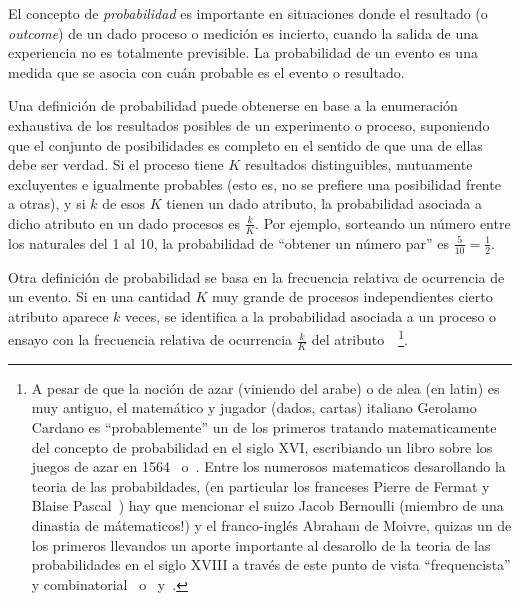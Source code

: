 \label{s:MP:Probabilidad}

El  concepto  de  {\it  probabilidad}  es importante  en  situaciones  donde  el
resultado (o {\it outcome}) de un  dado proceso o medici\'on es incierto, cuando
la salida de una experiencia no  es totalmente previsible. La probabilidad de un
evento es una medida que se asocia con cu\'an probable es el evento o resultado.

Una  definici\'on de  probabilidad puede  obtenerse en  base a  la enumeraci\'on
exhaustiva de los resultados posibles de un experimento o proceso,
suponiendo que el conjunto de posibilidades es completo en el sentido de que una
de  ellas debe ser  verdad. Si  el proceso  tiene $K$  resultados distinguibles,
mutuamente  excluyentes e  igualmente probables  (esto  es, no  se prefiere  una
posibilidad frente a  otras), y si $k$  de esos $K$ tienen un  dado atributo, la
probabilidad asociada a dicho atributo en un dado procesos es $\frac{k}{K}$. Por
ejemplo, sorteando un n\'umero entre los  naturales del 1 al 10, la probabilidad
de ``obtener un n\'umero par'' es $\frac5{10} = \frac12$.

Otra  definici\'on  de  probabilidad  se  basa  en  la  frecuencia  relativa  de
ocurrencia  de  un evento.   Si  en  una cantidad  $K$  muy  grande de  procesos
independientes  cierto   atributo  aparece  $k$   veces,  se  identifica   a  la
probabilidad  asociada a  un  proceso o  ensayo  con la  frecuencia relativa  de
ocurrencia    $\frac{k}{K}$    del    atributo~\cite[\&   Ref.]{Bra76,    Hal90,
  ShaVov06}~\footnote{A pesar de que la  noci\'on de azar (viniendo del arabe) o
  de alea (en  latin) es muy antiguo, el matem\'atico  y jugador (dados, cartas)
  italiano  Gerolamo Cardano es  ``probablemente'' un  de los  primeros tratando
  matematicamente del concepto  de probabilidad en el siglo  XVI, escribiando un
  libro sobre  los juegos  de azar en  1564~\cite{Bel05} o~\cite[Cap.~4]{Hal90}.
  Entre los  numerosos matematicos desarollando la teoria  de las probabildades,
  (en    particular    los    franceses    Pierre    de    Fermat    y    Blaise
  Pascal~\cite[Cap.~5]{Hal90})  hay  que  mencionar  el  suizo  Jacob  Bernoulli
  (miembro de una  dinastia de m\'atematicos!)  y el  franco-ingl\'es Abraham de
  Moivre, quizas un de los  primeros llevandos un aporte importante al desarollo
  de la teoria de las probabilidades en  el siglo XVIII a trav\'es de este punto
  de    vista   ``frequencista''   y    combinatorial~\cite[en   latin]{Ber1713}
  o~\cite{Ber1713:2, Dem56} y~\cite[Cap.~13, 15 \&~22]{Hal90}.}.

